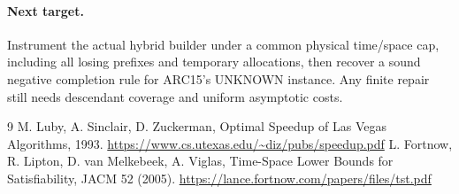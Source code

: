 \documentclass[11pt]{article}
\begin{document}
\paragraph{Next target.}
Instrument the actual hybrid builder under a common physical time/space cap,
including all losing prefixes and temporary allocations, then recover a sound
negative completion rule for ARC15's UNKNOWN instance. Any finite repair still
needs descendant coverage and uniform asymptotic costs.

\begin{thebibliography}{9}
 M. Luby, A. Sinclair, D. Zuckerman,
Optimal Speedup of Las Vegas Algorithms, 1993.
\url{https://www.cs.utexas.edu/~diz/pubs/speedup.pdf}
 L. Fortnow, R. Lipton, D. van Melkebeek, A. Viglas,
Time-Space Lower Bounds for Satisfiability, JACM 52 (2005).
\url{https://lance.fortnow.com/papers/files/tst.pdf}
\end{thebibliography}
\end{document}
